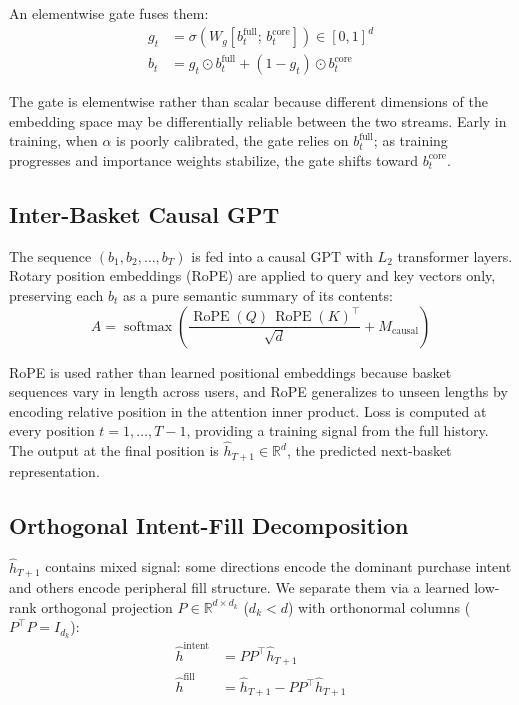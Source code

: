 \documentclass[conference]{IEEEtran}
\begin{document}
An elementwise gate fuses them:
\begin{align}
g_t &= \sigma\!\left(W_g [b_t^{\text{full}};\, b_t^{\text{core}}]\right) \in [0,1]^d \\
b_t &= g_t \odot b_t^{\text{full}} + (1 - g_t) \odot b_t^{\text{core}}
\end{align}

The gate is elementwise rather than scalar because different dimensions
of the embedding space may be differentially reliable between the two
streams. Early in training, when $\alpha$ is poorly calibrated, the
gate relies on $b_t^{\text{full}}$; as training progresses and
importance weights stabilize, the gate shifts toward $b_t^{\text{core}}$.

\subsection{Inter-Basket Causal GPT}

The sequence $(b_1, b_2, \ldots, b_T)$ is fed into a causal GPT with
$L_2$ transformer layers. Rotary position embeddings (RoPE) are applied
to query and key vectors only, preserving each $b_t$ as a pure semantic
summary of its contents:
\begin{equation}
A = \operatorname{softmax}\!\left(\frac{\operatorname{RoPE}(Q)\,\operatorname{RoPE}(K)^\top}{\sqrt{d}} + M_{\text{causal}}\right)
\end{equation}

RoPE is used rather than learned positional embeddings because basket
sequences vary in length across users, and RoPE generalizes to
unseen lengths by encoding relative position in the attention inner
product. Loss is computed at every position $t = 1, \ldots, T-1$,
providing a training signal from the full history. The output at the
final position is $\hat{h}_{T+1} \in \mathbb{R}^d$, the predicted
next-basket representation.

\subsection{Orthogonal Intent-Fill Decomposition}

$\hat{h}_{T+1}$ contains mixed signal: some directions encode the
dominant purchase intent and others encode peripheral fill structure.
We separate them via a learned low-rank orthogonal projection
$P \in \mathbb{R}^{d \times d_k}$ ($d_k < d$) with orthonormal columns
($P^\top P = I_{d_k}$):
\begin{align}
\hat{h}^{\text{intent}} &= PP^\top \hat{h}_{T+1} \\
\hat{h}^{\text{fill}}   &= \hat{h}_{T+1} - PP^\top \hat{h}_{T+1}
\end{align}
\end{document}

